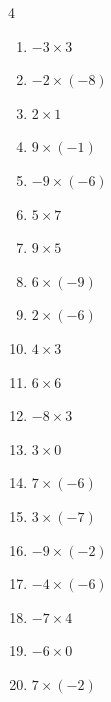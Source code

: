 \begin{multicols}{4}
\begin{enumerate}
  \item $-3\times 3$
        \phantom{$=-9$}

  \item $-2\times (-8)$
        \phantom{$=16$}

  \item $2\times 1$
        \phantom{$=2$}

  \item $9\times (-1)$
        \phantom{$=-9$}

  \item $-9\times (-6)$
        \phantom{$=54$}

  \item $5\times 7$
        \phantom{$=35$}

  \item $9\times 5$
        \phantom{$=45$}

  \item $6\times (-9)$
        \phantom{$=-54$}

  \item $2\times (-6)$
        \phantom{$=-12$}

  \item $4\times 3$
        \phantom{$=12$}

\columnbreak %

  \item $6\times 6$
        \phantom{$=36$}

  \item $-8\times 3$
        \phantom{$=-24$}

  \item $3\times 0$
        \phantom{$=0$}

  \item $7\times (-6)$
        \phantom{$=-42$}

  \item $3\times (-7)$
        \phantom{$=-21$}

  \item $-9\times (-2)$
        \phantom{$=18$}

  \item $-4\times (-6)$
        \phantom{$=24$}

  \item $-7\times 4$
        \phantom{$=-28$}

  \item $-6\times 0$
        \phantom{$=0$}

  \item $7\times (-2)$
        \phantom{$=-14$}


\end{enumerate}
\end{multicols}
